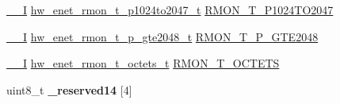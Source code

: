 \begin{DoxyCompactItemize}
\hyperlink{core__sc300_8h_af63697ed9952cc71e1225efe205f6cd3}{\+\_\+\+\_\+I} \hyperlink{union__hw__enet__rmon__t__p1024to2047}{hw\+\_\+enet\+\_\+rmon\+\_\+t\+\_\+p1024to2047\+\_\+t} \hyperlink{struct__hw__enet_acd3a9dedf7351c73b19d9b64371f398f}{R\+M\+O\+N\+\_\+\+T\+\_\+\+P1024\+T\+O2047}
\item 
\hyperlink{core__sc300_8h_af63697ed9952cc71e1225efe205f6cd3}{\+\_\+\+\_\+I} \hyperlink{union__hw__enet__rmon__t__p__gte2048}{hw\+\_\+enet\+\_\+rmon\+\_\+t\+\_\+p\+\_\+gte2048\+\_\+t} \hyperlink{struct__hw__enet_a7a4a5372e7d34256b49ebdea5bd8989d}{R\+M\+O\+N\+\_\+\+T\+\_\+\+P\+\_\+\+G\+T\+E2048}
\item 
\hyperlink{core__sc300_8h_af63697ed9952cc71e1225efe205f6cd3}{\+\_\+\+\_\+I} \hyperlink{union__hw__enet__rmon__t__octets}{hw\+\_\+enet\+\_\+rmon\+\_\+t\+\_\+octets\+\_\+t} \hyperlink{struct__hw__enet_a7dbb8720ab9339f8451b94930f09047e}{R\+M\+O\+N\+\_\+\+T\+\_\+\+O\+C\+T\+E\+TS}
\item 
uint8\+\_\+t {\bfseries \+\_\+reserved14} \mbox{[}4\mbox{]}\hypertarget{struct__hw__enet_a8d9a1a84bdbc95f8ac5da204f556a6e4}{}\label{struct__hw__enet_a8d9a1a84bdbc95f8ac5da204f556a6e4}


\end{DoxyCompactItemize}
